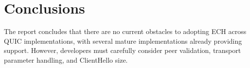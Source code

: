 \section{Conclusions}

The report concludes that there are no current obstacles to adopting ECH across QUIC implementations, with several mature implementations already providing support. However, developers must carefully consider peer validation, transport parameter handling, and ClientHello size.
